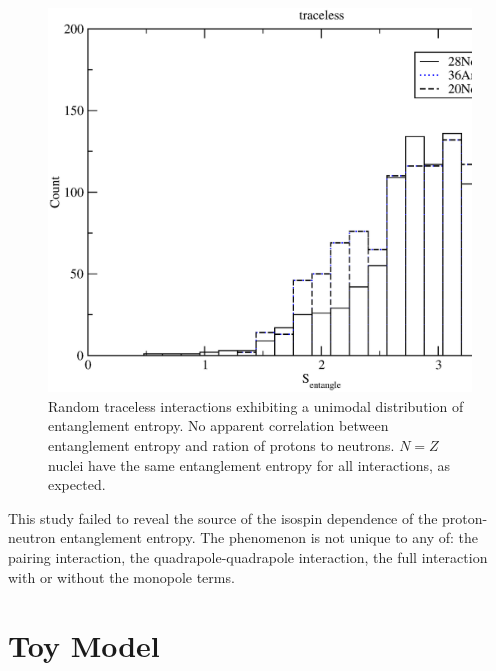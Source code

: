 \begin{figure}
    \centering
    \includegraphics[width=.75\textwidth,clip]{Figures/rand_s_ne_nmp}
    \caption{Random traceless interactions exhibiting a unimodal distribution of entanglement entropy. No
apparent correlation between entanglement entropy and ration of protons to neutrons. $N=Z$ nuclei have the
same entanglement entropy for all interactions, as expected.}
    \label{figrand2}
\end{figure}

This study failed to reveal the source of the isospin dependence of the
proton-neutron entanglement entropy. The phenomenon is not unique to
any of: the pairing interaction, the quadrapole-quadrapole interaction,
the full interaction with or without the monopole terms.

\section{Toy Model}

